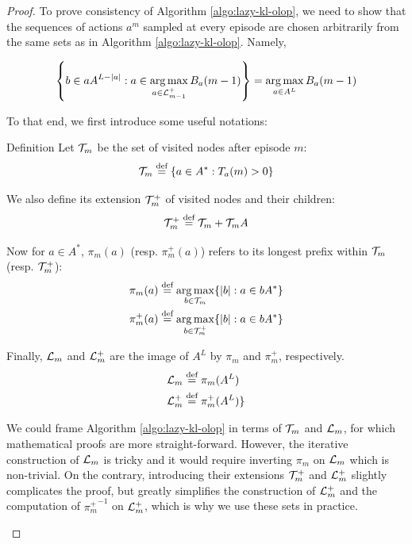 \documentclass[runningheads, envcountsame, a4paper]{llncs}
\begin{document}
\begin{proof}

To prove consistency of Algorithm \ref{algo:lazy-kl-olop}, we need to show that the sequences of actions $a^m$ sampled at every episode are chosen arbitrarily from the same sets as in Algorithm \ref{algo:lazy-kl-olop}.
Namely, 

\begin{equation*}
    \left\{ b\in a A^{L-|a|} : a \in \operatorname*{arg\,max}_{a\in \mathcal{L}_{m-1}^+} B_a(m-1)\right\} = \operatorname*{arg\,max}_{a\in A^L} B_a(m-1)
\end{equation*}

To that end, we first introduce some useful notations:

\begin{paragraph}{Definition}
Let $\mathcal{T}_m$ be the set of visited nodes after episode $m$:
\begin{equation*}
    \Tau_m \eqdef \left\{a\in A^*: T_a(m) > 0\right\}
\end{equation*}

We also define its extension $\mathcal{T}_m^+$ of visited nodes and their children:
\begin{equation*}
    \Tau_m^+ \eqdef \Tau_m + \Tau_m A
\end{equation*}

Now for $a\in A^*$, $\pi_m(a)$ (resp. $\pi_m^+(a)$) refers to its longest prefix within $\mathcal{T}_m$ (resp. $\mathcal{T}_m^+$):
\begin{align*}
    \pi_m(a) &\eqdef \argmax_{b\in\Tau_m} \{|b|: a\in b A^* \} \\
    \pi_m^+(a) &\eqdef \argmax_{b\in\Tau_m^+} \{|b|: a\in b A^* \}
\end{align*}

Finally, $\mathcal{L}_m$ and $\mathcal{L}_m^+$ are the image of $A^L$ by $\pi_m$ and $\pi_m^+$, respectively.
\begin{align*}
    \LL_m &\eqdef \pi_m(A^L) \\
    \LL_m^+ &\eqdef \pi_m^+(A^L) \}
\end{align*}
\end{paragraph}

\begin{remark}
We could frame Algorithm \ref{algo:lazy-kl-olop} in terms of $\mathcal{T}_m$ and $\mathcal{L}_m$, for which mathematical proofs are more straight-forward. However, the iterative construction of $\mathcal{L}_m$ is tricky and it would require inverting $\pi_m$ on $\mathcal{L}_m$ which is non-trivial. On the contrary, introducing their extensions  $\mathcal{T}_m^+$ and $\mathcal{L}_m^+$ slightly complicates the proof, but greatly simplifies the construction of $\mathcal{L}_m^+$ and the computation of ${\pi_m^+}^{-1}$ on $\mathcal{L}_m^+$, which is why we use these sets in practice.
\end{remark}


\end{proof}
\end{document}
